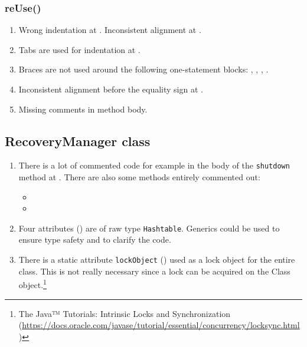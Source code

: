 \subsubsection{reUse()}
\begin{enumerate}
    \item {} Wrong indentation at . Inconsistent alignment at .
    \item {} Tabs are used for indentation at .
    \item {} Braces are not used around the following one-statement blocks: , , , .
    \item {} Inconsistent alignment before the equality sign at .
    \item {} Missing comments in method body.
\end{enumerate}

\subsection{RecoveryManager class}
\label{sec:recoverymanager-class}

\begin{enumerate}
	\item {} There is a lot of commented code for example in the body of the \texttt{shutdown} method at . There are also some methods entirely commented out:
	\begin{itemize}
		\item {}
		\item {}
	\end{itemize}
	\item {} Four attributes () are of raw type \texttt{Hashtable}. Generics could be used to ensure type safety and to clarify the code.
    \item There is a static attribute \texttt{lockObject} () used as a lock object for the entire class. This is not really necessary since a lock can be acquired on the Class object.\footnote{The Java™ Tutorials: Intrinsic Locks and Synchronization (\url{https://docs.oracle.com/javase/tutorial/essential/concurrency/locksync.html})}

\end{enumerate}

